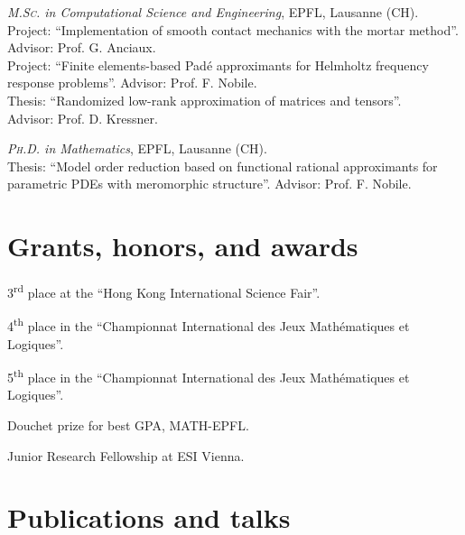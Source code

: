 \documentclass[11pt]{article} %
\begin{document}
\emph{\textsc{M.Sc.} in Computational Science and Engineering}, EPFL, Lausanne (CH).\\
Project: ``Implementation of smooth contact mechanics with the mortar method''.\\
\phantom{m}\hfill Advisor: Prof. G. Anciaux.\\
Project: ``Finite elements-based Pad\'e approximants for Helmholtz frequency response problems''.\hspace{9em}\phantom{m} \hfill Advisor: Prof. F. Nobile.\\
Thesis: ``Randomized low-rank approximation of matrices and tensors''.\\
\phantom{m}\hfill Advisor: Prof. D. Kressner.

\emph{\textsc{Ph.D.} in Mathematics}, EPFL, Lausanne (CH).\\
Thesis: ``Model order reduction based on functional rational approximants for parametric PDEs with meromorphic structure''.\hspace{9em}\phantom{m} \hfill Advisor: Prof. F. Nobile.


\section*{Grants, honors, and awards}

\hspace{\parindent}3\textsuperscript{rd} place at the ``Hong Kong International Science Fair''.

4\textsuperscript{th} place in the ``Championnat International des Jeux Math\'ematiques et Logiques''.

5\textsuperscript{th} place in the ``Championnat International des Jeux Math\'ematiques et Logiques''.

Douchet prize for best GPA, MATH-EPFL.

Junior Research Fellowship at ESI Vienna.


\section*{Publications and talks}
\end{document}
